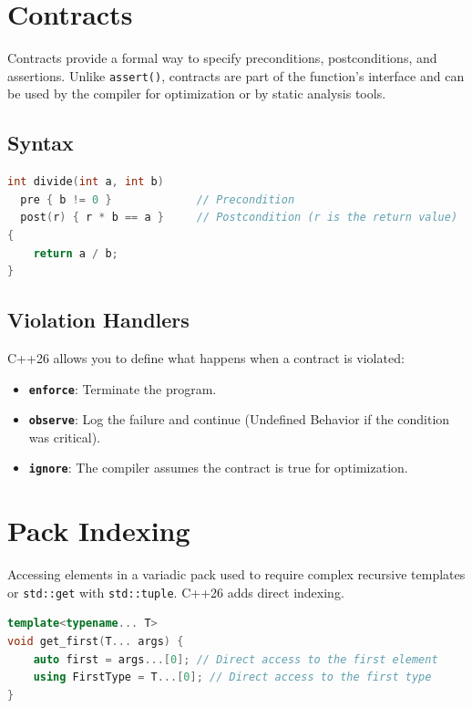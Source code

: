 \section{Contracts}

Contracts provide a formal way to specify preconditions, postconditions, and assertions. Unlike \texttt{assert()}, contracts are part of the function's interface and can be used by the compiler for optimization or by static analysis tools.

\subsection{Syntax}
\begin{lstlisting}[language=C++]
int divide(int a, int b)
  pre { b != 0 }             // Precondition
  post(r) { r * b == a }     // Postcondition (r is the return value)
{
    return a / b;
}
\end{lstlisting}

\subsection{Violation Handlers}
C++26 allows you to define what happens when a contract is violated:
\begin{itemize}
    \item \textbf{\texttt{enforce}}: Terminate the program.
    \item \textbf{\texttt{observe}}: Log the failure and continue (Undefined Behavior if the condition was critical).
    \item \textbf{\texttt{ignore}}: The compiler assumes the contract is true for optimization.
\end{itemize}

\section{Pack Indexing}

Accessing elements in a variadic pack used to require complex recursive templates or \texttt{std::get} with \texttt{std::tuple}. C++26 adds direct indexing.

\begin{lstlisting}[language=C++]
template<typename... T>
void get_first(T... args) {
    auto first = args...[0]; // Direct access to the first element
    using FirstType = T...[0]; // Direct access to the first type
}
\end{lstlisting}

